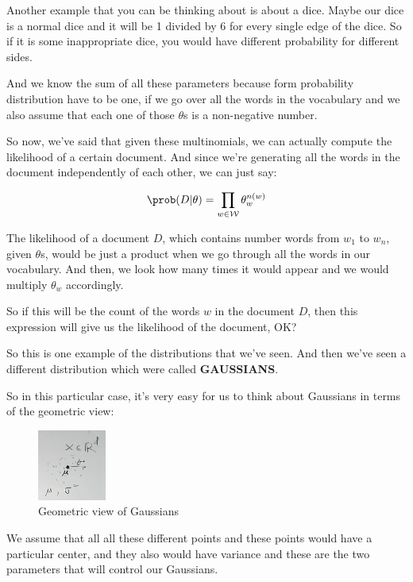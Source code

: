\documentclass[a4paper, 12pt]{article}
\begin{document}
Another example that you can be thinking about is about a dice. Maybe our dice
is a normal dice and it will be 1 divided by 6 for every single edge of the
dice. So if it is some inappropriate dice, you would have different probability
for different sides.

And we know the sum of all these parameters because form probability
distribution have to be one, if we go over all the words in the vocabulary and
we also assume that each one of those \(\theta\)s is a non-negative number.

So now, we've said that given these multinomials, we can actually compute the
likelihood of a certain document. And since we're generating all the words in
the document independently of each other, we can just say:

\begin{equation}
\label{eq:org073fa52}
\prob(D|\theta) = \prod_{w \in \mathcal{W}} \theta_{w}^{n(w)}
\end{equation}

The likelihood of a document \(D\), which contains number words from \(w_1\) to
\(w_n\), given \(\theta\)s, would be just a product when we go through all the
words in our vocabulary. And then, we look how many times it would appear and we
would multiply \(\theta_w\) accordingly.

So if this will be the count of the words \(w\) in the document \(D\), then this
expression will give us the likelihood of the document, OK?

So this is one example of the distributions that we've seen. And then we've seen
a different distribution which were called \textbf{GAUSSIANS}.

So in this particular case, it's very easy for us to think about Gaussians in
terms of the geometric view:

\begin{figure}[H]
\centering
\includegraphics[width=0.2\textwidth]{./pic/u04-02-fig-01.png}
\caption{\label{fig:org171fb92}Geometric view of Gaussians}
\end{figure}

We assume that all all these different points and these points would have a
particular center, and they also would have variance and these are the two
parameters that will control our Gaussians.
\end{document}
